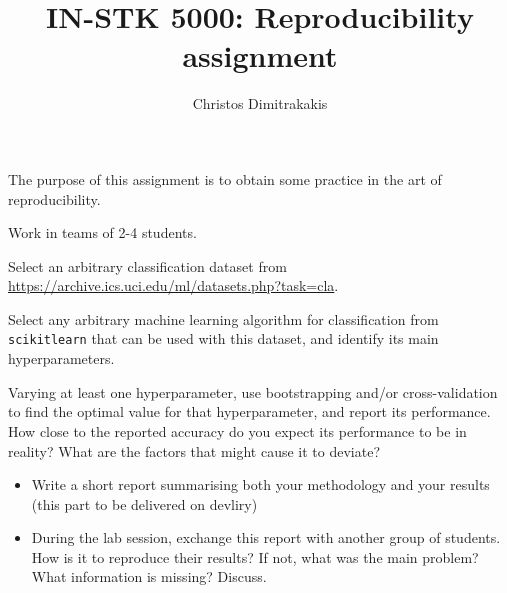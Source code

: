 \documentclass[a4paper]{article}
\title{IN-STK 5000: Reproducibility assignment}
\author{Christos Dimitrakakis}
\begin{document}
\maketitle
The purpose of this assignment is to obtain some practice in the art of reproducibility.

\begin{exercise}
  Work in teams of 2-4 students.

  Select an arbitrary classification dataset from \url{https://archive.ics.uci.edu/ml/datasets.php?task=cla}. 

  Select any arbitrary machine learning algorithm for classification
  from \texttt{scikitlearn} that can be used with this dataset, and identify its main hyperparameters.
    
  Varying at least one hyperparameter, use bootstrapping and/or
  cross-validation to find the optimal value for that hyperparameter,
  and report its performance. How close to the reported accuracy do
  you expect its performance to be in reality?  What are the factors
  that might cause it to deviate?
  
  \begin{itemize}
  \item Write a short report summarising both your methodology and
    your results (this part to be delivered on devliry)

  \item During the lab session, exchange this report with another
    group of students.  How is it to reproduce their results? If not,
    what was the main problem? What information is missing? Discuss.
  \end{itemize}


\end{exercise}
\end{document}
